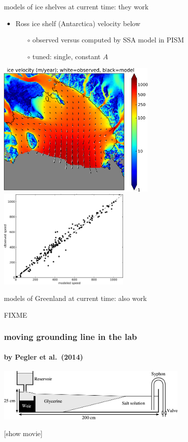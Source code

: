 \documentclass[10pt,hyperref={pdfpagelabels=true}]{beamer}
\begin{document}
\begin{frame}{models of ice shelves at current time: they work}

\begin{itemize}
\item Ross ice shelf (Antarctica) velocity below
  \begin{itemize}
  \item[$\circ$] observed versus computed by SSA model in PISM
  \item[$\circ$] tuned: single, constant $A$
  \end{itemize}
\end{itemize}
\vspace{-0.3in}

\begin{center}
  \mbox{\includegraphics[width=0.58\textwidth]{rossquiver} \, \includegraphics[width=0.48\textwidth]{rossscatter}}
\end{center}
\end{frame}


\begin{frame}{models of Greenland at current time: also work}

FIXME
\end{frame}


\begin{frame}
  \frametitle{moving grounding line in the lab}
  \framesubtitle{by Pegler et al.~(2014)}

\begin{center}

\includegraphics[width=0.7\textwidth]{pegler2014-grounding-line-schematic}

\vspace{1.0in}
[show movie]
\end{center}
\end{frame}
\end{document}
